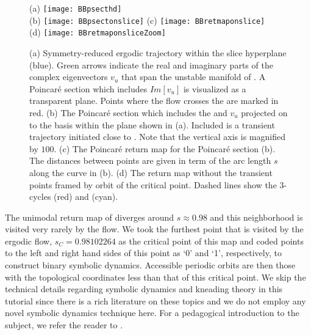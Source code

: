 {\begin{figure}
\centering
  (a) \texttt{[image: BBpsecthd]} \\
  (b) \texttt{[image: BBpsectonslice]}
  (c) \texttt{[image: BBretmaponslice]} \\
  (d) \texttt{[image: BBretmaponsliceZoom]}
\caption{(a) Symmetry-reduced ergodic trajectory within the slice hyperplane (blue).
			Green arrows indicate the real and imaginary parts of the complex eigenvectors
			$v_u$ that span the unstable manifold of \REQV{}{}. A Poincar\'e section which includes
			$Im[v_u]$ is visualized as a transparent plane. Points where the flow crosses 
			the are marked in red.
		 (b) The Poincar\'e section which includes the \REQV{}{} and $v_u$ projected
			on to the basis within the plane shown in (a). Included is a
            transient trajectory initiated close to \REQV{}{}. Note that
		  	the vertical axis is magnified by $100$.
		 (c) The Poincar\'e return map for the Poincar\'e section (b). The distances between points 
		are given in term of the arc length $s$ along the curve in (b).
		 (d) The return map without the transient points framed by
            orbit of the critical point.
		 	Dashed lines show the 3-cycles  (red) and  (cyan).}
\label{fig:psectandretmap}
\end{figure}

The unimodal return map of  diverges around 
$s \approx 0.98$ and this neighborhood is visited very rarely by the flow. We 
took the furthest point that is visited by the ergodic flow, $s_C=0.98102264$ 
as the critical point of this map and coded points to the left and right hand sides of this
point as `0' and `1', respectively, to construct binary symbolic dynamics. 
Accessible periodic orbits are then those with the topological coordinates 
less than that of this critical point. We skip the technical details 
regarding symbolic dynamics and kneading theory in this tutorial since 
there is a rich literature on these topics and we do not employ any novel 
symbolic dynamics technique here. For a pedagogical introduction to the 
subject, we refer the reader to . 

}
